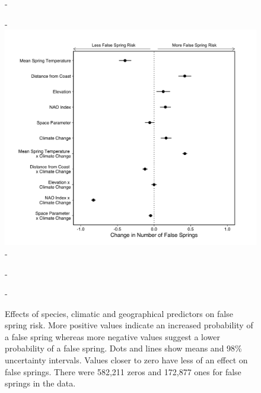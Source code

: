 \documentclass{article}\usepackage[]{graphicx}\usepackage[]{color}
\begin{document}
  
{\begin{figure} [H]
  -\begin{center}
  -\includegraphics[width=12cm]{..//analyses/figures/model_output_98_orig.png}
  -\caption{Effects of species, climatic and geographical predictors on false spring risk. More positive values indicate an increased probability of a false spring whereas more negative values suggest a lower probability of a false spring. Dots and lines show means and 98\% uncertainty intervals. Values closer to zero have less of an effect on false springs. There were 582,211 zeros and 172,877 ones for false springs in the data.}\label{fig:maineffects}
  -\end{center}
  -\end{figure}}
  
\end{document}

